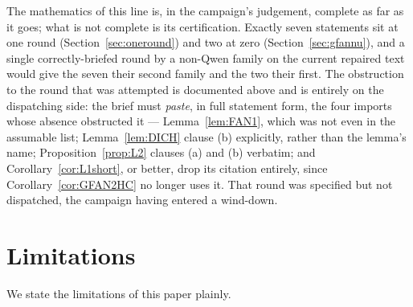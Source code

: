 The mathematics of this line is, in the campaign's judgement, complete as far as it goes;
what is not complete is its certification. Exactly seven statements sit at one round
(Section~\ref{sec:oneround}) and two at zero (Section~\ref{sec:gfannu}), and a single
correctly-briefed round by a non-Qwen family on the current repaired text would give the
seven their second family and the two their first. The obstruction to the round that was attempted
is documented above and is entirely on the dispatching side: the brief must \emph{paste}, in
full statement form, the four imports whose absence obstructed it --- Lemma~\ref{lem:FAN1},
which was not even in the assumable list; Lemma~\ref{lem:DICH} clause (b) explicitly, rather
than the lemma's name; Proposition~\ref{prop:L2} clauses (a) and (b) verbatim; and
Corollary~\ref{cor:L1short}, or better, drop its citation entirely, since
Corollary~\ref{cor:GFAN2HC} no longer uses it. That round was specified but not dispatched,
the campaign having entered a wind-down.

\section{Limitations}\label{sec:limits}

We state the limitations of this paper plainly.


